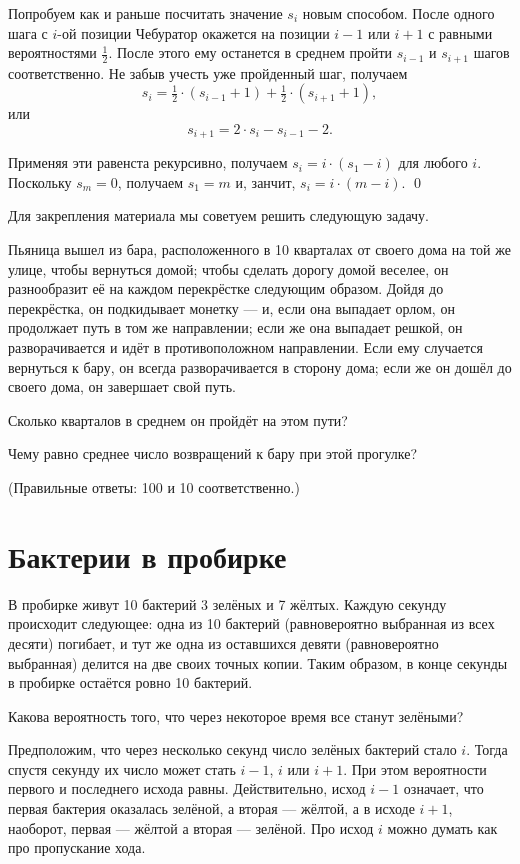 \documentclass{article}
\begin{document}
Попробуем как и раньше посчитать значение $s_i$ новым способом.
После одного шага с $i$-ой позиции
Чебуратор окажется на позиции $i-1$ или $i+1$ с равными вероятностями $\tfrac12$.
После этого ему останется в среднем пройти $s_{i-1}$ и $s_{i+1}$ шагов соответственно. 
Не забыв учесть уже пройденный шаг, получаем
\[s_i=\tfrac12\cdot(s_{i-1}+1)+\tfrac12\cdot(s_{i+1}+1),\]
или 
\[s_{i+1}=2\cdot s_i-s_{i-1}-2.\]

Применяя эти равенста рекурсивно, получаем
$s_i=i\cdot(s_1-i)$
для любого $i$.
Поскольку $s_m=0$, получаем $s_1=m$ и, занчит,
$s_i=i\cdot(m-i)$.
\qed
\medskip

Для закрепления материала мы советуем решить следующую задачу.

Пьяница вышел из бара, расположенного в 10 кварталах от своего дома на той же улице, чтобы вернуться домой; 
чтобы сделать дорогу домой веселее, он разнообразит её на каждом перекрёстке следующим образом. 
Дойдя до перекрёстка, он подкидывает монетку --- и, если она выпадает орлом, он продолжает путь в том же направлении; если же она выпадает решкой, он разворачивается и идёт в противоположном направлении. 
Если ему случается вернуться к бару, он всегда разворачивается в сторону дома; если же он дошёл до своего дома, он завершает свой путь. 

Сколько кварталов в среднем он пройдёт на этом пути?

Чему равно среднее число возвращений к бару при этой прогулке?

(Правильные ответы: 100 и 10 соответственно.)


\section{Бактерии в пробирке}

В пробирке живут 10 бактерий 3 зелёных и 7 жёлтых.
Каждую секунду происходит следующее: одна из 10 бактерий (равновероятно выбранная из всех десяти) погибает,
и тут же одна из оставшихся девяти (равновероятно выбранная)
 делится на две своих точных копии.
Таким образом,
в конце секунды в пробирке остаётся ровно 10 бактерий.

Какова вероятность того, что через некоторое время все станут зелёными?


Предположим, что через несколько секунд 
число зелёных бактерий стало $i$.
Тогда спустя секунду их число может стать $i-1$, $i$ или $i+1$.
При этом вероятности первого и последнего исхода равны.
Действительно, исход $i-1$ означает, 
что первая бактерия оказалась зелёной, а вторая --- жёлтой,
а в исходе $i+1$,
наоборот, первая --- жёлтой а вторая --- зелёной.
Про исход $i$ можно думать как про пропускание хода.
\end{document}
